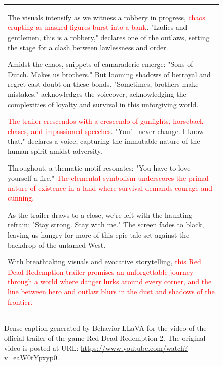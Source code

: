\begin{landscape}
\begin{figure}[!t]
\begin{minipage}[c]{0.9\textwidth}
\begin{tabular}{p{10cm}}
The visuals intensify as we witness a robbery in progress, \textcolor{red}{chaos erupting as masked figures burst into a bank}. "Ladies and gentlemen, this is a robbery," declares one of the outlaws, setting the stage for a clash between lawlessness and order.

Amidst the chaos, snippets of camaraderie emerge: "Sons of Dutch. Makes us brothers." But looming shadows of betrayal and regret cast doubt on these bonds. "Sometimes, brothers make mistakes," acknowledges the voiceover, acknowledging the complexities of loyalty and survival in this unforgiving world.

\textcolor{red}{The trailer crescendos with a crescendo of gunfights, horseback chases, and impassioned speeches}. "You'll never change. I know that," declares a voice, capturing the immutable nature of the human spirit amidst adversity.

Throughout, a thematic motif resonates: "You have to love yourself a fire." \textcolor{red}{The elemental symbolism underscores the primal nature of existence in a land where survival demands courage and cunning.}

As the trailer draws to a close, we're left with the haunting refrain: "Stay strong. Stay with me." The screen fades to black, leaving us hungry for more of this epic tale set against the backdrop of the untamed West.

With breathtaking visuals and evocative storytelling, \textcolor{red}{this Red Dead Redemption trailer promises an unforgettable journey through a world where danger lurks around every corner, and the line between hero and outlaw blurs in the dust and shadows of the frontier.}
\end{tabular}
\end{minipage}
\caption{Dense caption generated by Behavior-LLaVA for the video of the official trailer of the game Red Dead Redemption 2. The original video is posted at URL: \url{https://www.youtube.com/watch?v=eaW0tYpxyp0}.}
\label{fig:qualitative-video-1}
\end{figure}





\end{landscape}
